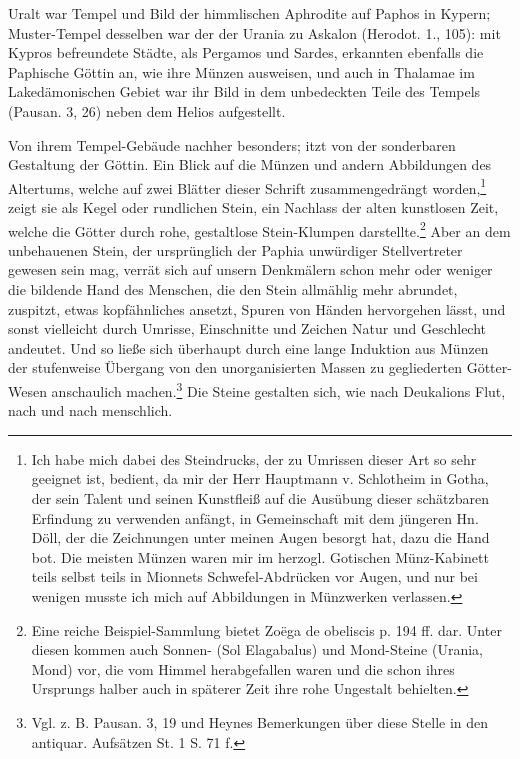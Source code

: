 \documentclass[a4paper, 11pt, oneside, polutonikogreek, german]{article}
\begin{document}
Uralt war Tempel und Bild der himmlischen Aphrodite auf Paphos in Kypern; Muster-Tempel desselben war der der Urania zu Askalon (Herodot. 1., 105): mit Kypros befreundete Städte, als Pergamos und Sardes, erkannten ebenfalls die Paphische Göttin an, wie ihre Münzen ausweisen, und auch in Thalamae im Lakedämonischen Gebiet war ihr Bild in dem unbedeckten Teile des Tempels (Pausan. 3, 26) neben dem Helios aufgestellt.

Von ihrem Tempel-Gebäude nachher besonders; itzt von der sonderbaren Gestaltung der Göttin. Ein Blick auf die Münzen und andern Abbildungen des Altertums, welche auf zwei Blätter dieser Schrift zusammengedrängt worden,\footnote{Ich habe mich dabei des Steindrucks, der zu Umrissen dieser Art so sehr geeignet ist, bedient, da mir der Herr Hauptmann v. Schlotheim in Gotha, der sein Talent und seinen Kunstfleiß auf die Ausübung dieser schätzbaren Erfindung zu verwenden anfängt, in Gemeinschaft mit dem jüngeren Hn. Döll, der die Zeichnungen unter meinen Augen besorgt hat, dazu die Hand bot. Die meisten Münzen waren mir im herzogl. Gotischen Münz-Kabinett teils selbst teils in Mionnets Schwefel-Abdrücken vor Augen, und nur bei wenigen musste ich mich auf Abbildungen in Münzwerken verlassen.} zeigt sie als Kegel oder rundlichen Stein, ein Nachlass der alten kunstlosen Zeit, welche die Götter durch rohe, gestaltlose Stein-Klumpen darstellte.\footnote{Eine reiche Beispiel-Sammlung bietet Zoëga de obeliscis p. 194 ff. dar. Unter diesen kommen auch Sonnen- (Sol Elagabalus) und Mond-Steine (Urania, Mond) vor, die vom Himmel herabgefallen waren und die schon ihres Ursprungs halber auch in späterer Zeit ihre rohe Ungestalt behielten.} Aber an dem unbehauenen Stein, der ursprünglich der Paphia unwürdiger Stellvertreter gewesen sein mag, verrät sich auf unsern Denkmälern schon mehr oder weniger die bildende Hand des Menschen, die den Stein allmählig mehr abrundet, zuspitzt, etwas kopfähnliches ansetzt, Spuren von Händen hervorgehen lässt, und sonst vielleicht durch Umrisse, Einschnitte und Zeichen Natur und Geschlecht andeutet. Und so ließe sich überhaupt durch eine lange Induktion aus Münzen der stufenweise Übergang von den unorganisierten Massen zu gegliederten Götter-Wesen anschaulich machen.\footnote{Vgl. z. B. Pausan. 3, 19 und Heynes Bemerkungen über diese Stelle in den antiquar. Aufsätzen St. 1 S. 71 f.} Die Steine gestalten sich, wie nach Deukalions Flut, nach und nach menschlich.
\end{document}
